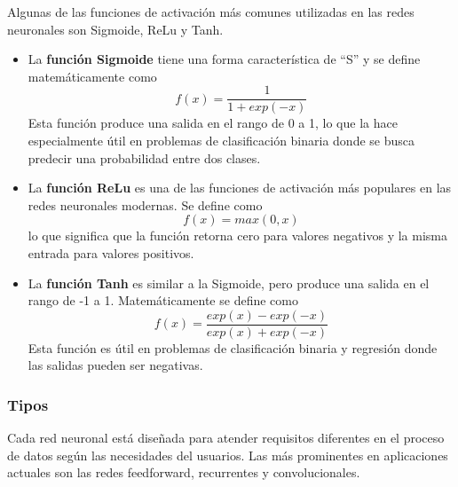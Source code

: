 Algunas de las funciones de activación más comunes utilizadas en las redes neuronales son Sigmoide, ReLu y Tanh.

\begin{itemize}
    \item La \textbf{función Sigmoide} tiene una forma característica de ``S'' y se define matemáticamente como \begin{equation}
        f(x) = \frac{1}{1 + exp(-x)}
    \end{equation} Esta función produce una salida en el rango de 0 a 1, lo que la hace especialmente útil en problemas de clasificación binaria donde se busca predecir una probabilidad entre dos clases.
    \item La \textbf{función ReLu} es una de las funciones de activación más populares en las redes neuronales modernas. Se define como \begin{equation}
        f(x) = max(0, x)
    \end{equation} lo que significa que la función retorna cero para valores negativos y la misma entrada para valores positivos.
    \item La \textbf{función Tanh} es similar a la Sigmoide, pero produce una salida en el rango de -1 a 1. Matemáticamente se define como \begin{equation}
        f(x) = \frac{exp(x) - exp(-x)}{exp(x) + exp(-x)}
    \end{equation} Esta función es útil en problemas de clasificación binaria y regresión donde las salidas pueden ser negativas.
\end{itemize}

\subsubsection{Tipos}
Cada red neuronal está diseñada para atender requisitos diferentes en el proceso de datos según las necesidades del usuarios. Las más prominentes en aplicaciones actuales son las redes feedforward, recurrentes y convolucionales. 

